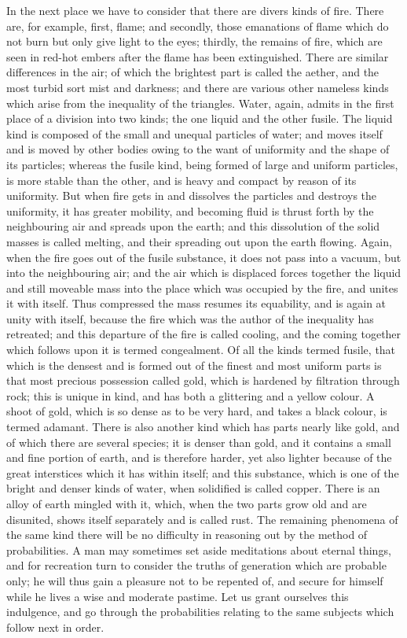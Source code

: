 In the next place we have to consider that there are divers kinds of fire.
There are, for example, first, flame; and secondly, those emanations of
flame which do not burn but only give light to the eyes; thirdly, the
remains of fire, which are seen in red-hot embers after the flame has been
extinguished. There are similar differences in the air; of which the
brightest part is called the aether, and the most turbid sort mist and
darkness; and there are various other nameless kinds which arise from the
inequality of the triangles. Water, again, admits in the first place of a
division into two kinds; the one liquid and the other fusile. The liquid
kind is composed of the small and unequal particles of water; and moves
itself and is moved by other bodies owing to the want of uniformity and
the shape of its particles; whereas the fusile kind, being formed of large
and uniform particles, is more stable than the other, and is heavy and
compact by reason of its uniformity. But when fire gets in and dissolves
the particles and destroys the uniformity, it has greater mobility, and
becoming fluid is thrust forth by the neighbouring air and spreads upon
the earth; and this dissolution of the solid masses is called melting, and
their spreading out upon the earth flowing. Again, when the fire goes out
of the fusile substance, it does not pass into a vacuum, but into the
neighbouring air; and the air which is displaced forces together the
liquid and still moveable mass into the place which was occupied by the
fire, and unites it with itself. Thus compressed the mass resumes its
equability, and is again at unity with itself, because the fire which was
the author of the inequality has retreated; and this departure of the fire
is called cooling, and the coming together which follows upon it is termed
congealment. Of all the kinds termed fusile, that which is the densest and
is formed out of the finest and most uniform parts is that most precious
possession called gold, which is hardened by filtration through rock; this
is unique in kind, and has both a glittering and a yellow colour. A shoot
of gold, which is so dense as to be very hard, and takes a black colour,
is termed adamant. There is also another kind which has parts nearly like
gold, and of which there are several species; it is denser than gold, and
it contains a small and fine portion of earth, and is therefore harder,
yet also lighter because of the great interstices which it has within
itself; and this substance, which is one of the bright and denser kinds of
water, when solidified is called copper. There is an alloy of earth
mingled with it, which, when the two parts grow old and are disunited,
shows itself separately and is called rust. The remaining phenomena of the
same kind there will be no difficulty in reasoning out by the method of
probabilities. A man may sometimes set aside meditations about eternal
things, and for recreation turn to consider the truths of generation which
are probable only; he will thus gain a pleasure not to be repented of, and
secure for himself while he lives a wise and moderate pastime. Let us
grant ourselves this indulgence, and go through the probabilities relating
to the same subjects which follow next in order.

